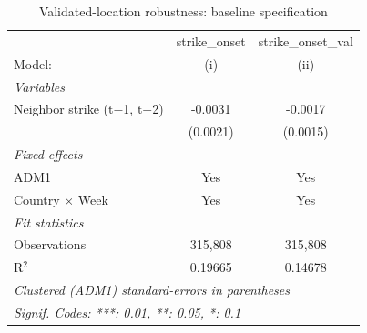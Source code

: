 \documentclass[
  11pt,
]{article}
\begin{document}
\begingroup
\centering
\begin{table}
\caption{Validated-location robustness: baseline specification}\tabularnewline

\centering
\begin{tabular}{lcc}
   \hline
                                  & strike\_onset  & strike\_onset\_val\\    
   Model:                         & (i)            & (ii)\\  
   \midrule
   \emph{Variables}\\
   Neighbor strike (t$-$1, t$-$2) & -0.0031        & -0.0017\\   
                                  & (0.0021)       & (0.0015)\\   
   \midrule
   \emph{Fixed-effects}\\
   ADM1                           & Yes            & Yes\\  
   Country $\times$ Week          & Yes            & Yes\\  
   \midrule
   \emph{Fit statistics}\\
   Observations                   & 315,808        & 315,808\\  
   R$^2$                          & 0.19665        & 0.14678\\  
   \hline
   \multicolumn{3}{l}{\emph{Clustered (ADM1) standard-errors in parentheses}}\\
   \multicolumn{3}{l}{\emph{Signif. Codes: ***: 0.01, **: 0.05, *: 0.1}}\\
\end{tabular}
\end{table}

\par\endgroup
\end{document}
